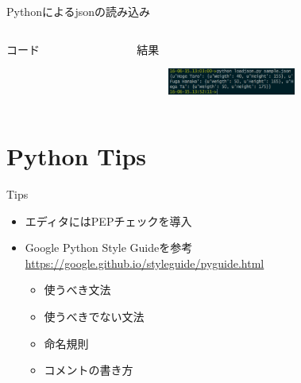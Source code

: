 \documentclass[12pt, dvipdfmx]{beamer}
\begin{document}
\begin{frame}{Pythonによるjsonの読み込み}
    \begin{columns}[t]
        \begin{column}{0.5\textwidth}
            \begin{block}{コード}
                \loadjsonpython
            \end{block}
        \end{column}
        \begin{column}{0.5\textwidth}
            \begin{block}{結果}
                \begin{figure}[h]
                    \centering
                    \includegraphics[width=4.2cm]{img/load_json_result.png}
                \end{figure}
            \end{block}
        \end{column}
    \end{columns}
\end{frame}

\section{Python Tips}
\begin{frame}{Tips}
    \begin{itemize}
        \item エディタにはPEPチェックを導入
        \item Google Python Style Guideを参考\href{https://google.github.io/styleguide/pyguide.html}{https://google.github.io/styleguide/pyguide.html}
        \begin{itemize}
            \item 使うべき文法
            \item 使うべきでない文法
            \item 命名規則
            \item コメントの書き方
        \end{itemize}
    \end{itemize}
\end{frame}
\end{document}
